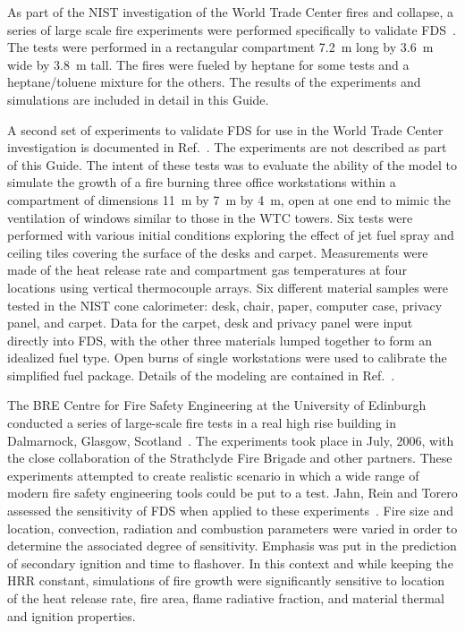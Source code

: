 As part of the NIST investigation of the World Trade Center fires and collapse, a series of large scale fire experiments were performed
specifically to validate FDS~\cite{NIST_NCSTAR_1-5B}.  The tests were performed in a rectangular compartment 7.2~m long by 3.6~m wide by 3.8~m
tall.  The fires were fueled by heptane for some tests and a heptane/toluene mixture for the others. The results of the experiments and simulations
are included in detail in this Guide.

A second set of experiments to validate FDS for use in the World Trade Center investigation is documented in Ref.~\cite{NIST_NCSTAR_1-5E}. The experiments
are not described as part of this Guide. The intent
of these tests was to evaluate the ability of the model to simulate the growth of a fire burning three office workstations within a compartment of
dimensions 11~m by 7~m by 4~m, open at one end to mimic the ventilation of windows similar to those in the WTC towers. Six tests were performed
with various initial conditions exploring the effect of jet fuel spray and ceiling tiles covering the surface of the desks and carpet. Measurements
were made of the heat release rate and compartment gas  temperatures at four  locations using vertical thermocouple arrays. Six different
material samples were tested in the NIST cone calorimeter: desk, chair, paper, computer case, privacy panel, and carpet. Data for the carpet,
desk and privacy panel were input directly into FDS, with the other three materials lumped together to form an idealized fuel type. Open burns of
single workstations were used to calibrate the simplified fuel package. Details of the modeling are contained in Ref.~\cite{NIST_NCSTAR_1-5F}.


The BRE Centre for Fire Safety Engineering at the University of Edinburgh conducted a series of large-scale fire tests in a real high rise building in Dalmarnock, Glasgow,
Scotland~\cite{Rein:Dalmarnock,Rein:FSJ}.
The experiments took place in July, 2006, with the close collaboration of the Strathclyde Fire Brigade and other partners.
These experiments attempted to create realistic scenario in which a wide range of modern fire safety engineering tools could be put to a test.
Jahn, Rein and Torero assessed the sensitivity of FDS when applied to these experiments~\cite{Jahn:IAFSS9}. Fire size and
location, convection, radiation and combustion parameters were varied in order to determine the associated
degree of sensitivity. Emphasis was put in the prediction of secondary ignition and time to flashover. In this
context and while keeping the HRR constant, simulations of fire growth were significantly sensitive to
location of the heat release rate, fire area, flame radiative fraction, and material thermal and ignition
properties.

